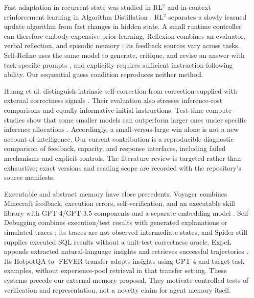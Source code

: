 \documentclass[11pt]{article}
\begin{document}
Fast adaptation in recurrent state was studied in RL$^2$ \cite{duan} and
in-context reinforcement learning in Algorithm Distillation \cite{laskin}.
RL$^2$ separates a slowly learned update algorithm from fast changes in hidden
state. A small runtime controller can therefore embody expensive prior learning.
Reflexion combines an evaluator, verbal reflection, and episodic memory
\cite{shinn}; its feedback sources vary across tasks. Self-Refine uses the same
model to generate, critique, and revise an answer with task-specific prompts
\cite{madaan}, and explicitly requires sufficient instruction-following ability.
Our sequential guess condition reproduces neither method.

Huang et al. distinguish intrinsic self-correction from correction supplied
with external correctness signals \cite{huang}. Their evaluation also stresses
inference-cost comparisons and equally informative initial instructions.
Test-time compute studies show that some smaller models can outperform larger
ones under specific inference allocations \cite{snell}. Accordingly, a
small-versus-large win alone is not a new account of intelligence. Our current
contribution is a reproducible diagnostic comparison of feedback, capacity,
and response interfaces, including failed mechanisms and explicit controls.
The literature review is targeted rather than exhaustive; exact versions and
reading scope are recorded with the repository's source manifests.


Executable and abstract memory have close precedents. Voyager combines
Minecraft feedback, execution errors, self-verification, and an executable
skill library with GPT-4/GPT-3.5 components and a separate embedding model
\cite{voyager}. Self-Debugging combines execution/test results with generated
explanations or simulated traces \cite{selfdebug}; its traces are not observed
intermediate states, and Spider still supplies executed SQL results without
a unit-test correctness oracle. ExpeL appends extracted natural-language
insights and retrieves successful trajectories \cite{expel}. Its HotpotQA-to-
FEVER transfer adapts insights using GPT-4 and target-task examples, without
experience-pool retrieval in that transfer setting. These systems precede
our external-memory proposal. They motivate controlled tests of verification
and representation, not a novelty claim for agent memory itself.
\end{document}

